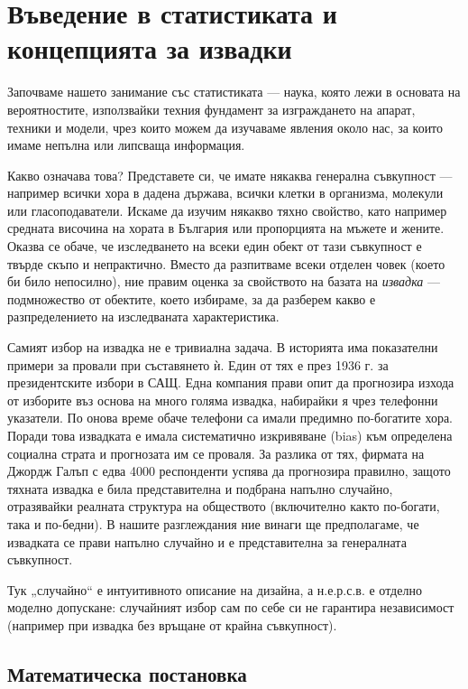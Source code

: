 \section{Въведение в статистиката и концепцията за извадки}

Започваме нашето занимание със статистиката — наука, която лежи в основата на вероятностите, използвайки техния фундамент за изграждането на апарат, техники и модели, чрез които можем да изучаваме явления около нас, за които имаме непълна или липсваща информация.

Какво означава това? Представете си, че имате някаква генерална съвкупност — например всички хора в дадена държава, всички клетки в организма, молекули или гласоподаватели. Искаме да изучим някакво тяхно свойство, като например средната височина на хората в България или пропорцията на мъжете и жените. Оказва се обаче, че изследването на всеки един обект от тази съвкупност е твърде скъпо и непрактично. Вместо да разпитваме всеки отделен човек (което би било непосилно), ние правим оценка за свойството на базата на \emph{извадка} — подмножество от обектите, което избираме, за да разберем какво е разпределението на изследваната характеристика.

Самият избор на извадка не е тривиална задача. В историята има показателни примери за провали при съставянето ѝ. Един от тях е през 1936 г. за президентските избори в САЩ. Една компания прави опит да прогнозира изхода от изборите въз основа на много голяма извадка, набирайки я чрез телефонни указатели. По онова време обаче телефони са имали предимно по-богатите хора. Поради това извадката е имала систематично изкривяване (bias) към определена социална страта и прогнозата им се проваля. За разлика от тях, фирмата на Джордж Галъп с едва 4000 респонденти успява да прогнозира правилно, защото тяхната извадка е била представителна и подбрана напълно случайно, отразявайки реалната структура на обществото (включително както по-богати, така и по-бедни). В нашите разглеждания ние винаги ще предполагаме, че извадката се прави напълно случайно и е представителна за генералната съвкупност.

Тук „случайно“ е интуитивното описание на дизайна, а н.е.р.с.в. е отделно
моделно допускане: случайният избор сам по себе си не гарантира независимост
(например при извадка без връщане от крайна съвкупност).

\subsection{Математическа постановка}


